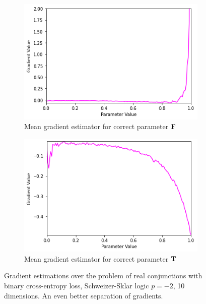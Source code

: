 \begin{figure}[h]
\begin{subfigure}[b]{0.47\textwidth}
        \includegraphics[width=\textwidth]{imgs/grad_ss_bce_falseparam_10dim_avg.png}
        \caption{Mean gradient estimator for correct parameter $\textbf{F}$}
        \label{fig:conjgrad10falseavgssbce}
    \end{subfigure}
    \begin{subfigure}[b]{0.47\textwidth}
        \centering
        \includegraphics[width=\textwidth]{imgs/grad_ss_bce_trueparam_10dim_avg.png}
        \caption{Mean gradient estimator for correct parameter $\textbf{T}$}
        \label{fig:conjgrad10trueavgssbce}
    \end{subfigure}
       \caption{Gradient estimations over the problem of real conjunctions with binary cross-entropy loss, Schweizer-Sklar logic $p=-2$, 10 dimensions. An even better separation of gradients.}
       \label{fig:conjgrad10ssbce}
\end{figure}

